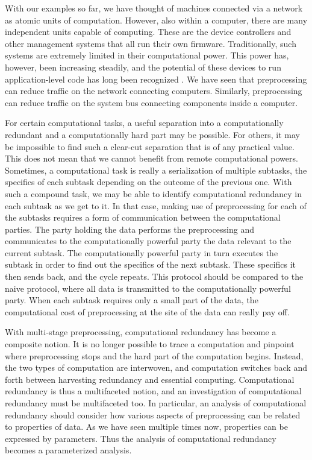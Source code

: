 With our examples so far, we have thought of machines connected via a network as atomic units of computation.
However, also within a computer, there are many independent units capable of computing.
These are the device controllers and other management systems that all run their own firmware.
Traditionally, such systems are extremely limited in their computational power.
This power has, however, been increasing steadily, and the potential of these devices to run application-level code has long been recognized \parencite[for example][]{riedel1998active}.
We have seen that preprocessing can reduce traffic on the network connecting computers.
Similarly, preprocessing can reduce traffic on the system bus connecting components inside a computer.

For certain computational tasks, a useful separation into a computationally redundant and a computationally hard part may be possible.
For others, it may be impossible to find such a clear-cut separation that is of any practical value.
This does not mean that we cannot benefit from remote computational powers.
Sometimes, a computational task is really a serialization of multiple subtasks, the specifics of each subtask depending on the outcome of the previous one.
With such a compound task, we may be able to identify computational redundancy in each subtask as we get to it.
In that case, making use of preprocessing for each of the subtasks requires a form of communication between the computational parties.
The party holding the data performs the preprocessing and communicates to the computationally powerful party the data relevant to the current subtask.
The computationally powerful party in turn executes the subtask in order to find out the specifics of the next subtask.
These specifics it then sends back, and the cycle repeats.
This protocol should be compared to the naive protocol, where all data is transmitted to the computationally powerful party.
When each subtask requires only a small part of the data, the computational cost of preprocessing at the site of the data can really pay off.

With multi-stage preprocessing, computational redundancy has become a composite notion.
It is no longer possible to trace a computation and pinpoint where preprocessing stops and the hard part of the computation begins.
Instead, the two types of computation are interwoven, and computation switches back and forth between harvesting redundancy and essential computing.
Computational redundancy is thus a multifaceted notion, and an investigation of computational redundancy must be multifaceted too.
In particular, an analysis of computational redundancy should consider how various aspects of preprocessing can be related to properties of data.
As we have seen multiple times now, properties can be expressed by parameters.
Thus the analysis of computational redundancy becomes a parameterized analysis.


